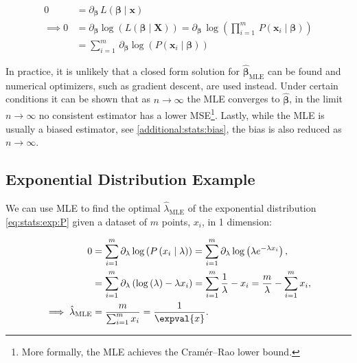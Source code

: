 \begin{subequations}\label{eq:MLE}
\begin{align}
0 &= \partial_{\bm{\beta}} \, L\left(\bm{\beta} \mid \mathbf{x}\right) \label{eq:MLE:L} \\
\implies 0 &= \partial_{\bm{\beta}} \log\left(L\left(\bm{\beta} \mid \mathbf{X}\right)\right) = \partial_{\bm{\beta}} \, \log\left(\prod_{i=1}^{m} \, P\left(\mathbf{x}_{i} \mid \bm{\beta}\right)\right) \label{eq:MLE:log_L} \\
&= \sum_{i=1}^{m} \, \partial_{\bm{\beta}} \log\left(P\left(\mathbf{x}_{i} \mid \bm{\beta}\right)\right) \label{eq:MLE:log_L_sum}
\end{align}
\end{subequations}

In practice, it is unlikely that a closed form solution for $\hat{\bm{\beta}}_{\text{MLE}}$ can be found
and numerical optimizers, such as gradient descent, are used instead.
Under certain conditions it can be shown that as $n \to \infty$ the MLE converges to $\hat{\bm{\beta}}$,
\ie in the limit $n \to \infty$ no consistent estimator
has a lower MSE\footnote{More formally, the MLE achieves the Cram\'er--Rao lower bound.}.
Lastly, while the MLE is usually a biased estimator, see \cref{additional:stats:bias},
the bias is also reduced as $n \to \infty$.

\subsection{Exponential Distribution Example}
\label{stats:MLE:exp_ex}

We can use MLE to find the optimal $\hat{\lambda}_{\text{MLE}}$ of
the exponential distribution \cref{eq:stats:exp:P}
given a dataset of $m$ points, $x_{i}$, in 1 dimension:

\begin{subequations}\label{eq:MLE:exp_ex}
\begin{align}
0 &= \sum_{i=1}^{m} \partial_{\lambda} \log\left(P\left(x_{i} \mid \lambda\right)\right) = \sum_{i=1}^{m} \partial_{\lambda} \log\left(\lambda e^{-\lambda x_{i}}\right), \label{eq:MLE:exp_ex:log_L_sum} \\
&= \sum_{i=1}^{m}\partial_{\lambda} \left( \log\left(\lambda\right) -\lambda x_{i}\right) = \sum_{i=1}^{m} \frac{1}{\lambda} - x_{i} = \frac{m}{\lambda} - \sum_{i=1}^{m} x_{i}, \label{eq:MLE:exp_ex:solve} \\
\implies \hat{\lambda}_{\text{MLE}} &= \frac{m}{\sum_{i=1}^{m} x_{i}} = \frac{1}{\expval{x}}. \label{eq:MLE:exp_ex:lambda}
\end{align}
\end{subequations}

